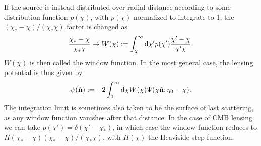 \documentclass[11pt]{article} %
\DeclareRobustCommand{\d}{\ifmmode\text{d}\else d\fi}
\begin{document}
If the source is instead distributed over radial distance according to some distribution function $p(\chi)$, with $p(\chi)$ normalized to integrate to 1, the $(\chi_* - \chi)/(\chi_*\chi)$ factor is changed as
\begin{equation*}
    \frac{\chi_*-\chi}{\chi_*\chi} \rightarrow W(\chi) := \int_\chi^{\infty}\d\chi' p(\chi')\frac{\chi'-\chi}{\chi'\chi}.
\end{equation*}
$W(\chi)$ is then called the window function. In the most general case, the lensing potential is thus given by
\begin{equation}
    \psi(\hat {\mathbf n}) := -2 \int_0^{\infty}\d \chi W(\chi)\Psi(\chi\hat{\mathbf n};\eta_0 - \chi).
\end{equation}
The integration limit is sometimes also taken to be the surface of last scattering, as any window function vanishes after that distance. In the case of CMB lensing we can take $p(\chi')=\delta(\chi'-\chi_*)$, in which case the window function reduces to $H(\chi_* - \chi)(\chi_*-\chi)/(\chi_*\chi)$, with $H(\chi)$ the Heaviside step function.

\end{document}
